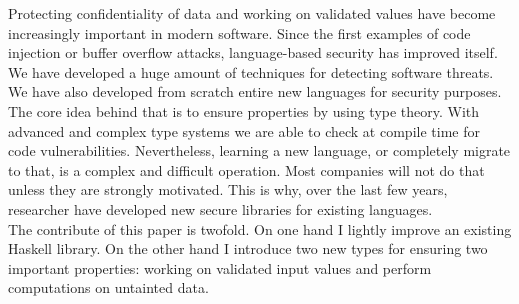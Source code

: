 Protecting confidentiality of data and working on validated values have become increasingly important in modern software. Since the first examples of code injection or buffer overflow attacks, language-based security has improved itself. We have developed a huge amount of techniques for detecting software threats. We have also developed from scratch entire new languages for security purposes. \\
The core idea behind that is to ensure properties by using type theory. With advanced and complex type systems we are able to check at compile time for code vulnerabilities. Nevertheless, learning a new language, or completely migrate to that, is a complex and difficult operation. Most companies will not do that unless they are strongly motivated. This is why, over the last few years, researcher have developed new secure libraries for existing languages. \\
The contribute of this paper is twofold. On one hand I lightly improve an existing Haskell library. On the other hand I introduce two new types for ensuring two important properties: working on validated input values and perform computations on untainted data.